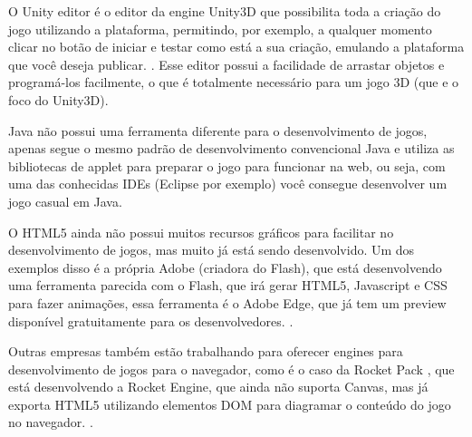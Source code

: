 O Unity editor é o editor da engine Unity3D que possibilita toda a
criação do jogo utilizando a plataforma, permitindo, por exemplo, a
qualquer momento clicar no botão de iniciar e testar como está a sua
criação, emulando a plataforma que você deseja publicar. \cite{website:unity3d}.
Esse editor possui a facilidade de arrastar objetos e programá-los
facilmente, o que é totalmente necessário para um jogo 3D (que e o
foco do Unity3D).

Java não possui uma ferramenta diferente para o desenvolvimento de
jogos, apenas segue o mesmo padrão de desenvolvimento convencional
Java e utiliza as bibliotecas de applet para preparar o jogo para
funcionar na web, ou seja, com uma das conhecidas IDEs (Eclipse por
exemplo) você consegue desenvolver um jogo casual em Java.

O HTML5 ainda não possui muitos recursos gráficos para facilitar no
desenvolvimento de jogos, mas muito já está sendo desenvolvido. Um dos
exemplos disso é a própria Adobe (criadora do Flash), que está
desenvolvendo uma ferramenta parecida com o Flash, que irá gerar
HTML5, Javascript e CSS para fazer animações, essa ferramenta é o
Adobe Edge, que já tem um preview disponível
gratuitamente para os desenvolvedores. \cite{website:adobeedge}.

Outras empresas também estão trabalhando para oferecer engines para
desenvolvimento de jogos para o navegador, como é o caso da Rocket
Pack \cite{website:rocketpack}, que está desenvolvendo a Rocket Engine,
que ainda não suporta Canvas, mas já
exporta HTML5 utilizando elementos DOM para diagramar o conteúdo do
jogo no navegador. \cite{website:rocketengine}.
